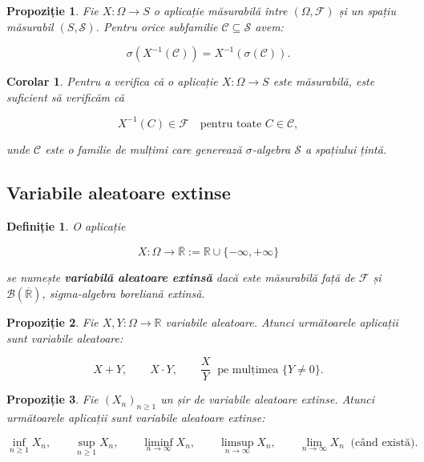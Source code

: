 \documentclass[12pt]{article}
\theoremstyle{plain}
\newtheorem{proposition}{Propoziție}
\newtheorem{corollary}{Corolar}
\newtheorem{definition}{Definiție}
\begin{document}
\begin{proposition}
Fie $X : \Omega \to S$ o aplicație măsurabilă între
$(\Omega, \mathcal{F})$ și un spațiu măsurabil $(S, \mathcal{S})$.
Pentru orice subfamilie $\mathcal{C} \subseteq \mathcal{S}$ avem:



\[
\sigma(X^{-1}(\mathcal{C})) = X^{-1}(\sigma(\mathcal{C})).
\]


\end{proposition}

\begin{corollary}
Pentru a verifica că o aplicație $X : \Omega \to S$ este măsurabilă,
este suficient să verificăm că



\[
X^{-1}(C) \in \mathcal{F}
\quad \text{pentru toate } C \in \mathcal{C},
\]



unde $\mathcal{C}$ este o familie de mulțimi care generează
$\sigma$-algebra $\mathcal{S}$ a spațiului țintă.
\end{corollary}

\subsection{Variabile aleatoare extinse}

\begin{definition}
O aplicație



\[
X : \Omega \to \overline{\mathbb{R}} := \mathbb{R} \cup \{-\infty, +\infty\}
\]



se numește \textbf{variabilă aleatoare extinsă} dacă este măsurabilă
față de $\mathcal{F}$ și $\mathcal{B}(\overline{\mathbb{R}})$,
sigma-algebra boreliană extinsă.
\end{definition}

\begin{proposition}
Fie $X, Y : \Omega \to \mathbb{R}$ variabile aleatoare.
Atunci următoarele aplicații sunt variabile aleatoare:



\[
X + Y, \qquad X \cdot Y, \qquad \frac{X}{Y} \ \text{ pe mulțimea } \{Y \neq 0\}.
\]


\end{proposition}

\begin{proposition}
Fie $(X_n)_{n \ge 1}$ un șir de variabile aleatoare extinse.
Atunci următoarele aplicații sunt variabile aleatoare extinse:



\[
\inf_{n \ge 1} X_n, \qquad
\sup_{n \ge 1} X_n, \qquad
\liminf_{n \to \infty} X_n, \qquad
\limsup_{n \to \infty} X_n, \qquad
\lim_{n \to \infty} X_n \ \text{ (când există)}.
\]


\end{proposition}
\end{document}

